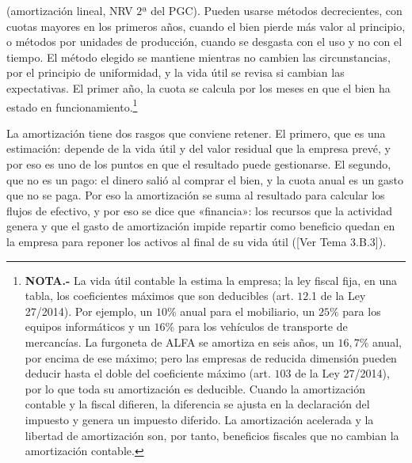 \documentclass[10pt,a4paper]{article}
\newcommand{\authorfont}[1]{{\fontfamily{EBGaramond-TLF}\selectfont #1}}
\begin{document}
(amortización lineal, NRV $2$ª del PGC). Pueden usarse métodos decrecientes, con cuotas mayores en los primeros años, cuando el bien pierde más valor al principio, o métodos por unidades de producción, cuando se desgasta con el uso y no con el tiempo. El método elegido se mantiene mientras no cambien las circunstancias, por el principio de uniformidad, y la vida útil se revisa si cambian las expectativas. El primer año, la cuota se calcula por los meses en que el bien ha estado en funcionamiento.\footnote{%
    \textbf{NOTA.-} La vida útil contable la estima la empresa; la ley fiscal fija, en una tabla, los coeficientes máximos que son deducibles (art. $12$.1 de la Ley 27/2014). Por ejemplo, un $10\%$ anual para el mobiliario, un $25\%$ para los equipos informáticos y un $16\%$ para los vehículos de transporte de mercancías. La furgoneta de ALFA se amortiza en seis años, un $16,7\%$ anual, por encima de ese máximo; pero las empresas de reducida dimensión pueden deducir hasta el doble del coeficiente máximo (art. $103$ de la Ley 27/2014), por lo que toda su amortización es deducible. Cuando la amortización contable y la fiscal difieren, la diferencia se ajusta en la declaración del impuesto y genera un impuesto diferido. La amortización acelerada y la libertad de amortización son, por tanto, beneficios fiscales que no cambian la amortización contable.
}

La amortización tiene dos rasgos que conviene retener. El primero, que es una estimación: depende de la vida útil y del valor residual que la empresa prevé, y por eso es uno de los puntos en que el resultado puede gestionarse. El segundo, que no es un pago: el dinero salió al comprar el bien, y la cuota anual es un gasto que no se paga. Por eso la amortización se suma al resultado para calcular los flujos de efectivo, y por eso se dice que «financia»: los recursos que la actividad genera y que el gasto de amortización impide repartir como beneficio quedan en la empresa para reponer los activos al final de su vida útil ([\authorfont{Ver Tema 3.B.3}]).
\end{document}

